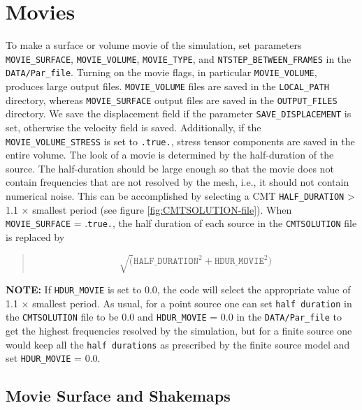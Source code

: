 \section{Movies}\label{sec:Movies}

To make a surface or volume movie of the simulation, set parameters
\texttt{MOVIE\_SURFACE}, \texttt{MOVIE\_VOLUME}, \texttt{MOVIE\_TYPE},
and \texttt{NTSTEP\_BETWEEN\_FRAMES} in the \texttt{DATA/Par\_file}. Turning
on the movie flags, in particular \texttt{MOVIE\_VOLUME}, produces
large output files. \texttt{MOVIE\_VOLUME} files are saved in the
\texttt{LOCAL\_PATH} directory, whereas \texttt{MOVIE\_SURFACE} output
files are saved in the \texttt{OUTPUT\_FILES} directory. We save the
displacement field if the parameter \texttt{SAVE\_DISPLACEMENT} is
set, otherwise the velocity field is saved. Additionally, if the \texttt{MOVIE\_VOLUME\_STRESS} is set to \texttt{.true.}, stress tensor components are saved in the entire volume. The look of a movie is
determined by the half-duration of the source. The half-duration should
be large enough so that the movie does not contain frequencies that
are not resolved by the mesh, i.e., it should not contain numerical
noise. This can be accomplished by selecting a CMT \texttt{HALF\_DURATION}
> 1.1 $\times$ smallest period (see figure \ref{fig:CMTSOLUTION-file}).
When \texttt{MOVIE\_SURFACE} = .\texttt{true.}, the half duration
of each source in the \texttt{CMTSOLUTION} file is replaced by
\begin{quote}
\[
\sqrt{(}\mathrm{\mathtt{HALF\_DURATIO}\mathtt{N}^{2}}+\mathrm{\mathtt{HDUR\_MOVI}\mathtt{E}^{2}})
\]
\end{quote}

\textbf{NOTE:} If \texttt{HDUR\_MOVIE} is set to 0.0, the code will
select the appropriate value of 1.1 $\times$ smallest period. As
usual, for a point source one can set \texttt{half duration} in the
\texttt{CMTSOLUTION} file to be 0.0 and \texttt{HDUR\_MOVIE} = 0.0
in the \texttt{DATA/Par\_file} to get the highest frequencies resolved
by the simulation, but for a finite source one would keep all the
\texttt{half durations} as prescribed by the finite source model and
set \texttt{HDUR\_MOVIE} = 0.0.

\subsection{Movie Surface and Shakemaps}

